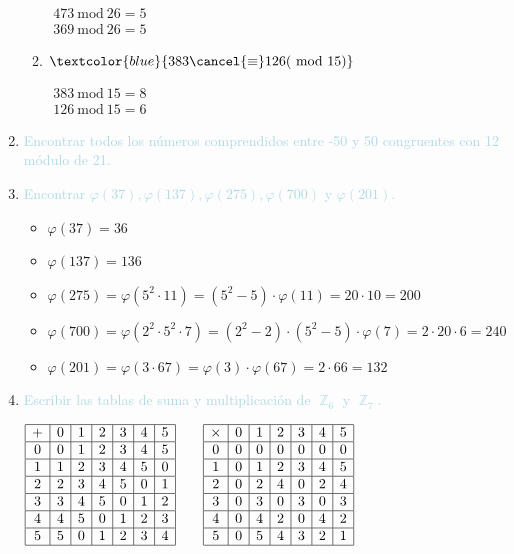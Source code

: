 \documentclass{article}
\newcommand{\lb}[1]{\textcolor{lightblue}{#1}}
\newcommand{\db}[1]{\textcolor{blue}{#1}}
\DeclareMathOperator{\Z}{\mathbb{Z}}
\renewcommand{\mod}{~\mathrm{mod}~}
\begin{document}
\begin{enumerate}[label=\color{red}\textbf{\arabic*)}, leftmargin=*]
\begin{enumerate}[label=\color{red}\alph*)]
		$\begin{array}{l}
			473\mod26=5\\
			369\mod26=5
		\end{array}$
		\item $\db{383\cancel{\equiv}126(\mod 15)}$
		
		$\begin{array}{l}
			383\mod 15=8\\
			126\mod 15=6
		\end{array}$
	\end{enumerate}
	\item \lb{Encontrar todos los números comprendidos entre -50 y 50 congruentes con 12 módulo de 21.}
	\item \lb{Encontrar $\varphi(37),\varphi(137),\varphi(275),\varphi(700)$ y $\varphi(201)$.}
	\begin{itemize}[label=\color{lightblue}$-$]
		\item $\varphi(37)=36$
		\item $\varphi(137)=136$
		\item $\varphi(275)=\varphi(5^2\cdot11)=(5^2-5)\cdot\varphi(11)=20\cdot10=200$
		\item $\varphi(700)=\varphi(2^2\cdot5^2\cdot7)=(2^2-2)\cdot(5^2-5)\cdot\varphi(7)=2\cdot20\cdot6=240$
		\item $\varphi(201)=\varphi(3\cdot67)=\varphi(3)\cdot\varphi(67)=2\cdot66=132$
	\end{itemize}
	
	\item \lb{Escribir las tablas de suma y multiplicación de $\Z_6$ y $\Z_7$.}
	
	$\begin{array}{|c|c|c|c|c|c|c|}
		\hline
		+ & 0 & 1 & 2 & 3 & 4 & 5 \\ \hline
		0 & 0 & 1 & 2 & 3 & 4 & 5 \\ \hline
		1 & 1 & 2 & 3 & 4 & 5 & 0 \\ \hline
		2 & 2 & 3 & 4 & 5 & 0 & 1 \\ \hline
		3 & 3 & 4 & 5 & 0 & 1 & 2 \\ \hline
		4 & 4 & 5 & 0 & 1 & 2 & 3 \\ \hline
		5 & 5 & 0 & 1 & 2 & 3 & 4 \\ \hline
	\end{array}\qquad\begin{array}{|c|c|c|c|c|c|c|}
	\hline
	\times & 0 & 1 & 2 & 3 & 4 & 5 \\ \hline
	0 & 0 & 0 & 0 & 0 & 0 & 0 \\ \hline
	1 & 0 & 1 & 2 & 3 & 4 & 5 \\ \hline
	2 & 0 & 2 & 4 & 0 & 2 & 4 \\ \hline
	3 & 0 & 3 & 0 & 3 & 0 & 3 \\ \hline
	4 & 0 & 4 & 2 & 0 & 4 & 2 \\ \hline
	5 & 0 & 5 & 4 & 3 & 2 & 1 \\ \hline
	\end{array}$
	

\end{enumerate}
\end{document}
